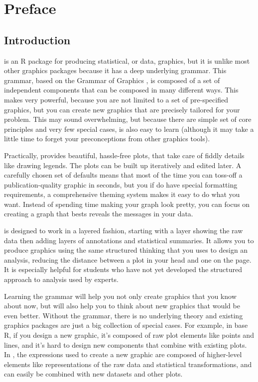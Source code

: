 

\chapter{Preface}

\section{Introduction}

\ggplot is an R package for producing statistical, or data, graphics, but it is unlike most other graphics packages because it has a deep underlying grammar. This grammar, based on the Grammar of Graphics \citep{wilkinson:2006}, is composed of a set of independent components that can be composed in many different ways.  This makes \ggplot very powerful, because you are not limited to a set of pre-specified graphics, but you can create new graphics that are precisely tailored for your problem. This may sound overwhelming, but because there are simple set of core principles and very few special cases, \ggplot is also easy to learn (although it may take a little time to forget your preconceptions from other graphics tools).

Practically, \ggplot provides beautiful, hassle-free plots, that take care of fiddly details like drawing legends.  The plots can be built up iteratively and edited later.  A carefully chosen set of defaults means that most of the time you can toss-off a publication-quality graphic in seconds, but you if do have special formatting requirements, a comprehensive theming system makes it easy to do what you want. Instead of spending time making your graph look pretty, you can focus on creating a graph that bests reveals the messages in your data.

\ggplot is designed to work in a layered fashion, starting with a layer showing the raw data then adding layers of annotations and statistical summaries.  It allows you to produce graphics using the same structured thinking that you uses to design an analysis, reducing the distance between a plot in your head and one on the page.  It is especially helpful for students who have not yet developed the structured approach to analysis used by experts.  

Learning the grammar will help you not only create graphics that you know about now, but will also help you to think about new graphics that would be even better.  Without the grammar, there is no underlying theory and existing graphics packages are just a big collection of special cases. For example, in base R, if you design a new graphic, it's composed of raw plot elements like points and lines, and it's hard to design new components that combine with existing plots.  In \ggplot, the expressions used to create a new graphic are composed of higher-level elements like representations of the raw data and statistical transformations, and can easily be combined with new datasets and other plots.

